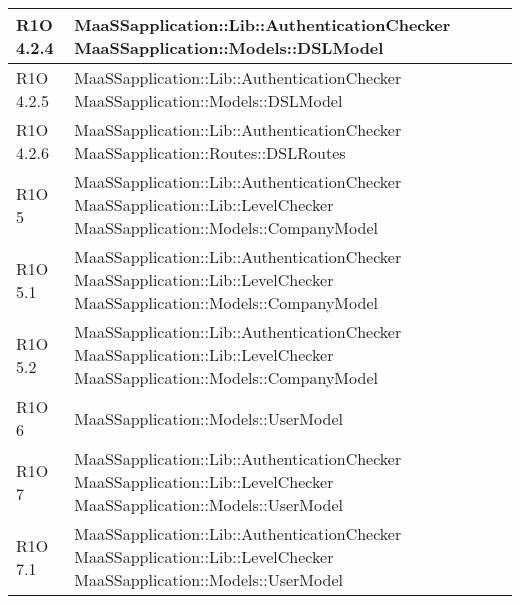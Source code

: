 \begin{center}
\begin{longtable}{ | l | p{8cm} |}
	R1O 4.2.4 & MaaSSapplication::Lib::AuthenticationChecker \newline  MaaSSapplication::Models::DSLModel  \newline  \\ \hline
	
	R1O 4.2.5 & MaaSSapplication::Lib::AuthenticationChecker \newline  MaaSSapplication::Models::DSLModel  \newline  \\ \hline
	
	R1O 4.2.6 & MaaSSapplication::Lib::AuthenticationChecker \newline  MaaSSapplication::Routes::DSLRoutes  \newline  \\ \hline
	
	R1O 5 & MaaSSapplication::Lib::AuthenticationChecker \newline MaaSSapplication::Lib::LevelChecker \newline  MaaSSapplication::Models::CompanyModel  \newline  \\ \hline
	
	R1O 5.1 & MaaSSapplication::Lib::AuthenticationChecker \newline MaaSSapplication::Lib::LevelChecker \newline MaaSSapplication::Models::CompanyModel  \newline  \\ \hline
	
	R1O 5.2 & MaaSSapplication::Lib::AuthenticationChecker \newline MaaSSapplication::Lib::LevelChecker \newline  MaaSSapplication::Models::CompanyModel  \newline  \\ \hline
	
	R1O 6 & MaaSSapplication::Models::UserModel \newline  \\ \hline
	
	R1O 7 &MaaSSapplication::Lib::AuthenticationChecker \newline MaaSSapplication::Lib::LevelChecker \newline  MaaSSapplication::Models::UserModel  \newline  \\ \hline
	
	R1O 7.1 & MaaSSapplication::Lib::AuthenticationChecker \newline MaaSSapplication::Lib::LevelChecker \newline  MaaSSapplication::Models::UserModel  \newline  \\ \hline
	

\end{longtable}
\end{center}
